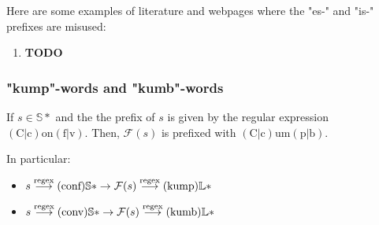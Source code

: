 \begin{example}
    Here are some examples of literature and webpages where the "es-" and "is-"
    prefixes are misused:
\end{example}

\begin{enumerate}
    \item \textbf{TODO}
\end{enumerate}

\subsubsection{"kump"-words and "kumb"-words}

If \(s\in \mathbb{S}*\) and the the prefix of \(s\) is given by the
regular expression \((\text{C}|\text{c})\text{on}(\text{f}|\text{v})\). Then,
\(\mathcal{F}(s)\) is prefixed with
\((\text{C}|\text{c})\text{um}(\text{p}|\text{b})\).

In particular:
\begin{itemize}
    \item \(s \overset{\text{regex}}{\longrightarrow} (\text{conf})\mathbb{S}* \rightarrow \mathcal{F}(s) \overset{\text{regex}}{\longrightarrow} (\text{kump})\mathbb{L}*\)
    \item \(s \overset{\text{regex}}{\longrightarrow} (\text{conv})\mathbb{S}* \rightarrow \mathcal{F}(s) \overset{\text{regex}}{\longrightarrow} (\text{kumb})\mathbb{L}*\)
\end{itemize}

